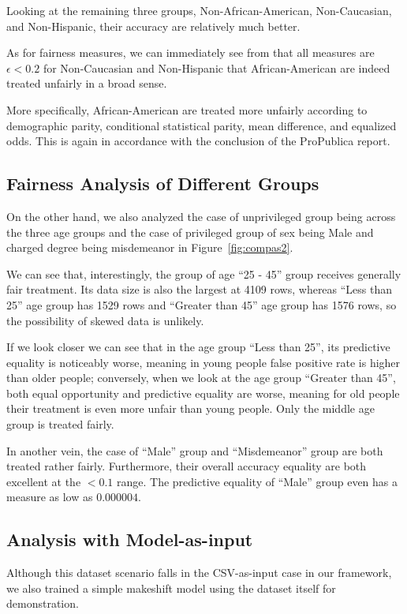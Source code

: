 \documentclass[conference]{IEEEtran}
\begin{document}
Looking at the remaining three groups, Non-African-American, Non-Caucasian, and Non-Hispanic, their accuracy are relatively much better.

As for fairness measures, we can immediately see from that all measures are $\epsilon < 0.2$ for Non-Caucasian and Non-Hispanic that African-American are indeed treated unfairly in a broad sense.

More specifically, African-American are treated more unfairly according to demographic parity, conditional statistical parity, mean difference, and equalized odds. This is again in accordance with the conclusion of the ProPublica report.

\subsection{Fairness Analysis of Different Groups}
On the other hand, we also analyzed the case of unprivileged group being across the three age groups and the case of privileged group of sex being Male and charged degree being misdemeanor in Figure~\ref{fig:compas2}.

We can see that, interestingly, the group of age ``25 - 45'' group receives generally fair treatment. Its data size is also the largest at 4109 rows, whereas ``Less than 25'' age group has 1529 rows and ``Greater than 45'' age group has 1576 rows, so the possibility of skewed data is unlikely.

If we look closer we can see that in the age group ``Less than 25'', its predictive equality is noticeably worse, meaning in young people false positive rate is higher than older people; conversely, when we look at the age group ``Greater than 45'', both equal opportunity and predictive equality are worse, meaning for old people their treatment is even more unfair than young people. Only the middle age group is treated fairly.

In another vein, the case of ``Male'' group and ``Misdemeanor'' group are both treated rather fairly. Furthermore, their overall accuracy equality are both excellent at the $< 0.1$ range. The predictive equality  of ``Male'' group even has a measure as low as $0.000004$.

\subsection{Analysis with Model-as-input}
Although this dataset scenario falls in the CSV-as-input case in our framework, we also trained a simple makeshift model using the dataset itself for demonstration.
\end{document}
